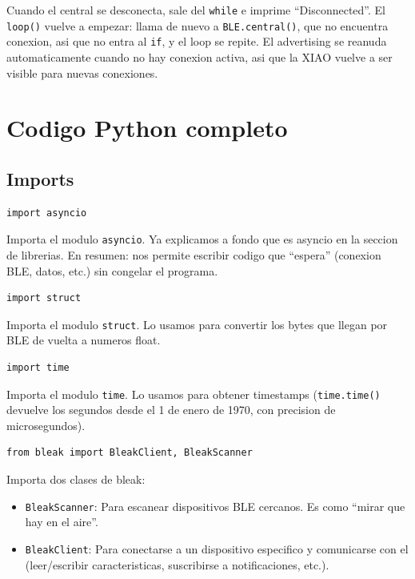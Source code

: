 \documentclass[11pt,a4paper]{article}
\begin{document}
Cuando el central se desconecta, sale del \texttt{while} e imprime
``Disconnected''. El \texttt{loop()} vuelve a empezar: llama de
nuevo a \texttt{BLE.central()}, que no encuentra conexion, asi que
no entra al \texttt{if}, y el loop se repite. El advertising se
reanuda automaticamente cuando no hay conexion activa, asi que la
XIAO vuelve a ser visible para nuevas conexiones.


\section{Codigo Python completo}

\subsection{Imports}

\begin{lstlisting}[style=python]
import asyncio
\end{lstlisting}

Importa el modulo \texttt{asyncio}. Ya explicamos a fondo que es
asyncio en la seccion de librerias. En resumen: nos permite
escribir codigo que ``espera'' (conexion BLE, datos, etc.) sin
congelar el programa.

\begin{lstlisting}[style=python]
import struct
\end{lstlisting}

Importa el modulo \texttt{struct}. Lo usamos para convertir los
bytes que llegan por BLE de vuelta a numeros float.

\begin{lstlisting}[style=python]
import time
\end{lstlisting}

Importa el modulo \texttt{time}. Lo usamos para obtener timestamps
(\texttt{time.time()} devuelve los segundos desde el 1 de enero de
1970, con precision de microsegundos).

\begin{lstlisting}[style=python]
from bleak import BleakClient, BleakScanner
\end{lstlisting}

Importa dos clases de bleak:

\begin{itemize}
    \item \texttt{BleakScanner}: Para escanear dispositivos BLE
          cercanos. Es como ``mirar que hay en el aire''.
    \item \texttt{BleakClient}: Para conectarse a un dispositivo
          especifico y comunicarse con el (leer/escribir
          caracteristicas, suscribirse a notificaciones, etc.).
\end{itemize}
\end{document}
